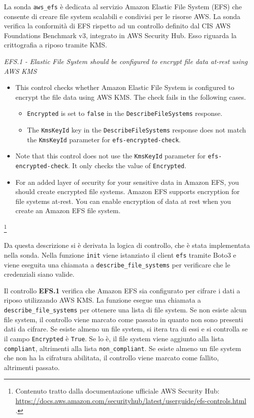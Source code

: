 La sonda \texttt{aws\_efs} è dedicata al servizio Amazon Elastic File System (EFS) che consente di creare file system scalabili e condivisi per le risorse AWS. La sonda verifica la conformità di EFS rispetto ad un controllo definito dal CIS AWS Foundations Benchmark v3, integrato in AWS Security Hub. Esso riguarda la crittografia a riposo tramite KMS.
\begin{mdframed}[backgroundcolor=gray!05, linecolor=gray!50]
\itshape
EFS.1 - Elastic File System should be configured to encrypt file data at-rest using AWS KMS
\begin{itemize}
    \item This control checks whether Amazon Elastic File System is configured to encrypt the file data using AWS KMS. The check fails in the following cases.
    \begin{itemize}
        \item \texttt{Encrypted} is set to \texttt{false} in the \texttt{DescribeFileSystems} response.
        \item The \texttt{KmsKeyId} key in the \texttt{DescribeFileSystems} response does not match the \texttt{KmsKeyId} parameter for \texttt{efs-encrypted-check}.
    \end{itemize}
    \item Note that this control does not use the \texttt{KmsKeyId} parameter for \texttt{efs-encrypted-check}. It only checks the value of \texttt{Encrypted}.
    \item For an added layer of security for your sensitive data in Amazon EFS, you should create encrypted file systems. Amazon EFS supports encryption for file systems at-rest. You can enable encryption of data at rest when you create an Amazon EFS file system.
\end{itemize}
\end{mdframed}
\footnote{Contenuto tratto dalla documentazione ufficiale AWS Security Hub: \url{https://docs.aws.amazon.com/securityhub/latest/userguide/efs-controls.html} .}

Da questa descrizione si è derivata la logica di controllo, che è stata implementata nella sonda. Nella funzione \texttt{init} viene istanziato il client \texttt{efs} tramite Boto3 e viene eseguita una chiamata a \texttt{describe\_file\_systems} per verificare che le credenziali siano valide.

Il controllo \textbf{EFS.1} verifica che Amazon EFS sia configurato per cifrare i dati a riposo utilizzando AWS KMS. La funzione esegue una chiamata a \texttt{describe\_file\_systems} per ottenere una lista di file system. Se non esiste alcun file system, il controllo viene marcato come passato in quanto non sono presenti dati da cifrare. Se esiste almeno un file system, si itera tra di essi e si controlla se il campo \texttt{Encrypted} è \texttt{True}. Se lo è, il file system viene aggiunto alla lista \texttt{compliant}, altrimenti alla lista \texttt{non\_compliant}. Se esiste almeno un file system che non ha la cifratura abilitata, il controllo viene marcato come fallito, altrimenti passato.

